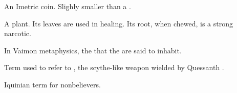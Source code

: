 \begin{gloss}
\begin{comment}
\paragraph{ducata}
\end{comment}
An Imetric coin. 
Slighly smaller than a . 









\begin{comment}
\paragraph{\dvingen}
\end{comment}
\gitem{\dvingen}
\index{\dvingen}
A plant. 
Its leaves are used in healing. 
Its root, when chewed, is a strong narcotic. 









\begin{comment}
\subparagraph{\empyrean}
\end{comment}
\gitem{\empyrean}
\index{\empyrean}
In Vaimon metaphysics, the  that the  are said to inhabit. 









\begin{comment}
\paragraph{glaive}
\end{comment}
\index{\Triestessakhin}
Term used to refer to \Triestessakhin, the scythe-like weapon wielded by Quessanth \Ishnaruchaefir. 








\begin{comment}
\paragraph{heathen}
\end{comment}
Iquinian term for nonbelievers. 










\end{gloss}
